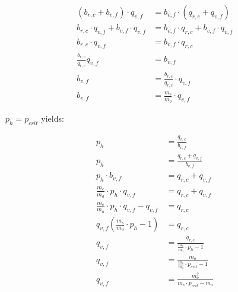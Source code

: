 \documentclass[table, twocolumn]{article}
\begin{document}
\begin{align} \label{eqn:bonding-curve-3}
  (b_{r, c} + b_{v, f}) \cdot q_{v, f}              & =
  b_{v, f} \cdot (q_{r, c} + q_{v, f}) \nonumber              \\
  b_{r, c} \cdot q_{v, f} + b_{v, f} \cdot q_{v, f} & =
  b_{v, f} \cdot q_{r, c} + b_{v, f} \cdot q_{v, f} \nonumber \\
  b_{r, c} \cdot q_{v, f}                           & =
  b_{v, f} \cdot q_{r, c} \nonumber                           \\
  \frac{b_{r, c}}{q_{r, c}} q_{v, f}                & =
  b_{v, f} \nonumber                                          \\
  b_{v, f}                                          & =
  \frac{b_{r, c}}{q_{r, c}} \cdot q_{v, f} \nonumber          \\
  b_{v, f}                                          & =
  \frac{m_s}{m_o} \cdot q_{v, f}
\end{align}

$p_h = p_{crit}$ yields:

\begin{align} \label{eqn:bonding-curve-4}
  p_h                                                 & =
  \frac{q_{v, c}}{b_{v, f}} \nonumber                      \\
  p_h                                                 & =
  \frac{q_{r, c} + q_{v, f}}{b_{v, f}} \nonumber           \\
  p_h \cdot b_{v, f}                                  & =
  q_{r, c} + q_{v, f} \nonumber                            \\
  \frac{m_e}{m_a} \cdot p_h \cdot q_{v, f}            & =
  q_{r, c} + q_{v, f} \nonumber                            \\
  \frac{m_e}{m_a} \cdot p_h \cdot q_{v, f} - q_{v, f} & =
  q_{r, c} \nonumber                                       \\
  q_{v, f} (\frac{m_s}{m_0} \cdot p_h - 1)            & =
  q_{r, c} \nonumber                                       \\
  q_{v, f}                                            & =
  \frac{q_{r, c}}{\frac{m_s}{m_o} \cdot p_h - 1} \nonumber \\
  q_{v, f}                                            & =
  \frac{m_o}{\frac{m_s}{m_o} \cdot p_{crit} - 1} \nonumber \\
  q_{v, f}                                            & =
  \frac{m_o ^ 2}{m_s \cdot p_{crit} - m_o}
\end{align}
\end{document}
